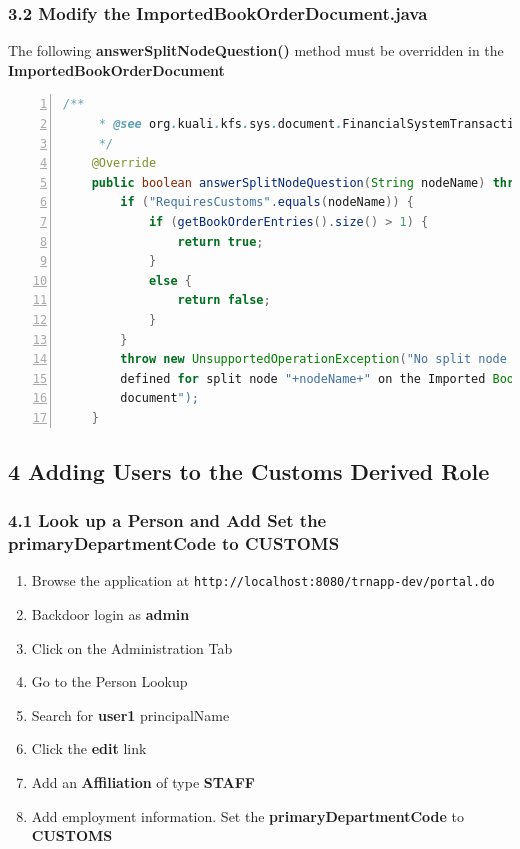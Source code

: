 \subsubsection*{3.2 Modify the ImportedBookOrderDocument.java}
The following \textbf{answerSplitNodeQuestion()} method must be overridden in the \textbf{ImportedBookOrderDocument}
\begin{lstlisting}[numbers=left,language=java,basicstyle=\scriptsize,backgroundcolor=\color{ubergray},caption={New
  KIM Type},frame=single,breaklines=true]
    /**
     * @see org.kuali.kfs.sys.document.FinancialSystemTransactionalDocumentBase#answerSplitNodeQuestion(java.lang.String)
     */
    @Override
    public boolean answerSplitNodeQuestion(String nodeName) throws UnsupportedOperationException {
        if ("RequiresCustoms".equals(nodeName)) {
            if (getBookOrderEntries().size() > 1) {
                return true;
            }
            else {
                return false;
            }
        }
        throw new UnsupportedOperationException("No split node logic
        defined for split node "+nodeName+" on the Imported Book Order
        document");
    }
\end{lstlisting}

\subsection*{4 Adding Users to the Customs Derived Role}
\subsubsection*{4.1 Look up a Person and Add Set the
  primaryDepartmentCode to CUSTOMS}
\begin{enumerate}
  \item Browse the application at
    \verb|http://localhost:8080/trnapp-dev/portal.do|
  \item Backdoor login as \textbf{admin}
  \item Click on the Administration Tab
  \item Go to the Person Lookup 
  \item Search for \textbf{user1} principalName

  \item Click the \textbf{edit} link
  \item Add an \textbf{Affiliation} of type \textbf{STAFF}

  \item Add employment information. Set the
    \textbf{primaryDepartmentCode} to \textbf{CUSTOMS}

\end{enumerate}


